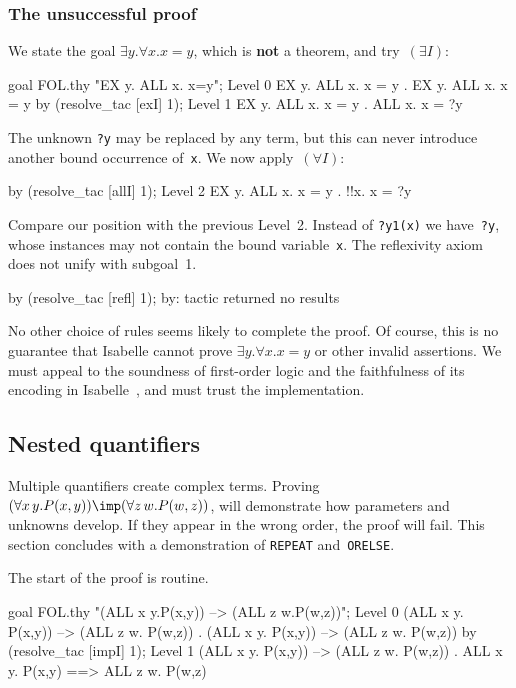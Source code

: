 \subsubsection{The unsuccessful proof}
We state the goal $\exists y.\forall x.x=y$, which is {\bf not} a theorem, and
try~$(\exists I)$:
\begin{ttbox}
goal FOL.thy "EX y. ALL x. x=y";
{\out Level 0}
{\out EX y. ALL x. x = y}
{. EX y. ALL x. x = y}
\ttbreak
by (resolve_tac [exI] 1);
{\out Level 1}
{\out EX y. ALL x. x = y}
{. ALL x. x = ?y}
\end{ttbox}
The unknown {\tt ?y} may be replaced by any term, but this can never
introduce another bound occurrence of~{\tt x}.  We now apply~$(\forall I)$:
\begin{ttbox}
by (resolve_tac [allI] 1);
{\out Level 2}
{\out EX y. ALL x. x = y}
{. !!x. x = ?y}
\end{ttbox}
Compare our position with the previous Level~2.  Instead of {\tt?y1(x)} we
have~{\tt?y}, whose instances may not contain the bound variable~{\tt x}.
The reflexivity axiom does not unify with subgoal~1.
\begin{ttbox}
by (resolve_tac [refl] 1);
{\out by: tactic returned no results}
\end{ttbox}
No other choice of rules seems likely to complete the proof.  Of course,
this is no guarantee that Isabelle cannot prove $\exists y.\forall x.x=y$
or other invalid assertions.  We must appeal to the soundness of
first-order logic and the faithfulness of its encoding in
Isabelle~\cite{paulson89}, and must trust the implementation.


\subsection{Nested quantifiers}
Multiple quantifiers create complex terms.  Proving $(\forall x\,y.P(x,y))
\imp (\forall z\,w.P(w,z))$, will demonstrate how parameters and
unknowns develop.  If they appear in the wrong order, the proof will fail.
This section concludes with a demonstration of {\tt REPEAT}
and~{\tt ORELSE}.  

The start of the proof is routine.
\begin{ttbox}
goal FOL.thy "(ALL x y.P(x,y))  -->  (ALL z w.P(w,z))";
{\out Level 0}
{\out (ALL x y. P(x,y)) --> (ALL z w. P(w,z))}
{. (ALL x y. P(x,y)) --> (ALL z w. P(w,z))}
\ttbreak
by (resolve_tac [impI] 1);
{\out Level 1}
{\out (ALL x y. P(x,y)) --> (ALL z w. P(w,z))}
{. ALL x y. P(x,y) ==> ALL z w. P(w,z)}
\end{ttbox}

